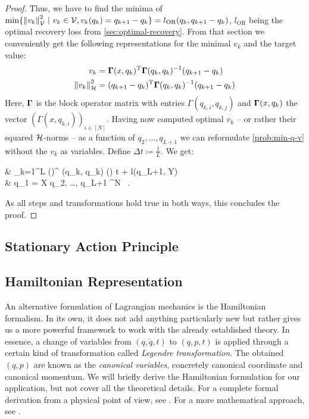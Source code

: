 \begin{proof}
	Thus, we have to find the minima of $\min\{\norm{v_k}_{\mathcal{V}}^2~|~ v_k \in \mathcal{V}, v_k(q_k) = q_{k+1} - q_k\} = l_{\text{OR}}(q_k, q_{k+1} - q_k)$, $l_{\text{OR}}$ being the optimal recovery loss from \cref{sec:optimal-recovery}.
	From that section we conveniently get the following representations for the minimal $v_k$ and the target value:
	\begin{align}
		v_k & = \mathbf{\Gamma}(x, q_k)^\mathrm{T}\mathbf{\Gamma}(q_k, q_k)^{-1} (q_{k+1} - q_k)\\
		\norm{v_k}_{\mathcal{H}}^2 &= (q_{k+1} - q_k)^\mathrm{T} \mathbf{\Gamma}(q_k, q_k)^{-1} (q_{k+1} - q_k)
	\end{align}
	Here, $\mathbf{\Gamma}$ is the block operator matrix with entries $\Gamma(q_{k,i}, q_{k, j})$ and $\mathbf{\Gamma}(x, q_k)$ the vector $(\Gamma(x, q_{k, i}))_{i \in [N]}$.
	Having now computed optimal $v_k$ -- or rather their squared $\mathcal{H}$-norms -- as a function of $q_2, \ldots, q_{L+1}$ we can reformulate \cref{prob:min-q-v} without the $v_k$ as variables.
	Define $\Delta t \coloneqq \frac{1}{L}$.
	We get:
	\begin{problem}
		\begin{cases}
			 & \nu \cdot {} \sum_{k=1}^{L}  
			\left(\right)^ \bGamma(q_k, q_k)
			\left(\right) \cdot \Delta t
			+ l(q_{L+1}, Y) \\
			 & q_1 = X  q_2, \ldots, q_{L+1} \in \cX^N \ .
		\end{cases}
	\end{problem}
	As all steps and transformations hold true in both ways, this concludes the proof.
\end{proof}

\subsection{Stationary Action Principle}



\subsection{Hamiltonian Representation}

An alternative formulation of Lagrangian mechanics is the Hamiltonian formalism.
In its own, it does not add anything particularly new but rather gives us a more powerful framework to work with the already established theory.
In essence, a change of variables from $(q, \dot{q}, t)$ to $(q, p, t)$ is applied through a certain kind of transformation called \emph{Legendre transformation}.
The obtained $(q, p)$ are known as the \emph{canonical variables}, concretely canonical coordinate and canonical momentum.
We will briefly derive the Hamiltonian formulation for our application, but not cover all the theoretical details.
For a complete formal derivation from a physical point of view, see \cite[Chapter~8]{goldstein01}.
For a more mathematical approach, see \cite[Chapter~2]{marsden10}.

